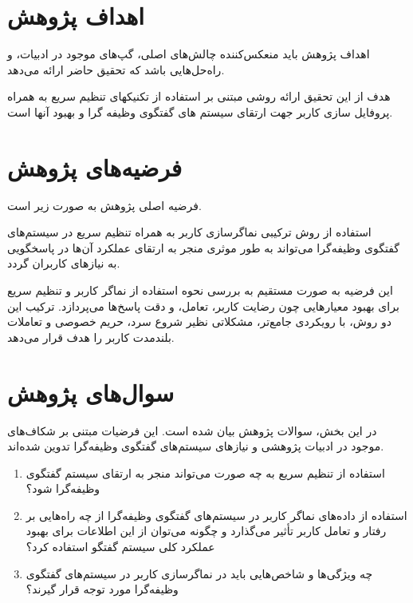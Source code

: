 \section{اهداف پژوهش}

اهداف پژوهش باید منعکس‌کننده چالش‌های اصلی، گپ‌های موجود در ادبیات، و راه‌حل‌هایی باشد که تحقیق حاضر ارائه می‌دهد. 

هدف از اين تحقیق ارائه روشی مبتنی بر استفاده از تکنیکهای تنظیم سريع به همراه پروفايل سازی کاربر جهت ارتقای سیستم های گفتگوی وظیفه گرا و بهبود آنها است.


\section{فرضیه‌های پژوهش}


فرضیه اصلی پژوهش به صورت زیر است.

استفاده از روش ترکیبی نماگر‌سازی کاربر به همراه تنظیم سریع در سیستم‌های گفتگوی وظیفه‌گرا می‌تواند به طور موثری منجر به ارتقای عملکرد آن‌ها در پاسخگویی به نیازهای کاربران گردد.

این فرضیه به صورت مستقیم به بررسی نحوه استفاده از نماگر کاربر و تنظیم سریع برای بهبود معیارهایی چون رضایت کاربر، تعامل، و دقت پاسخ‌ها می‌پردازد. ترکیب این دو روش، با رویکردی جامع‌تر، مشکلاتی نظیر شروع سرد، حریم خصوصی و تعاملات بلندمدت کاربر را هدف قرار می‌دهد.


\section{سوال‌های پژوهش}

در این بخش، سوالات پژوهش بیان شده است. این فرضیات مبتنی بر شکاف‌های موجود در ادبیات پژوهشی و نیازهای سیستم‌های گفتگوی وظیفه‌گرا تدوین شده‌اند.

\begin{enumerate}
\item
استفاده از تنظیم سریع به چه صورت می‌تواند منجر به ارتقای سیستم گفتگوی وظیفه‌گرا شود؟

\item
استفاده از داده‌های نماگر کاربر در سیستم‌های گفتگوی وظیفه‌گرا از چه راه‌هایی بر رفتار و تعامل کاربر تأثیر می‌گذارد و چگونه می‌توان از این اطلاعات برای بهبود عملکرد کلی سیستم گفتگو استفاده کرد؟

\item
چه ویژگی‌ها و شاخص‌هایی باید در نماگر‌سازی کاربر در سیستم‌های گفتگوی وظیفه‌گرا مورد توجه قرار گیرند؟
\end{enumerate}

